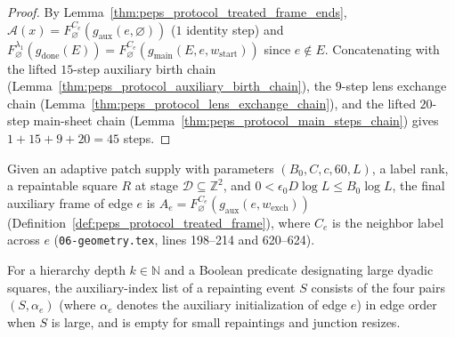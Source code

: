 \begin{proof}\leanok
    By Lemma~\ref{thm:peps_protocol_treated_frame_ends}, $\mathcal A(x)=F_\varnothing^{C_e}(g_{\mathrm{aux}}(e,\varnothing))$ ($1$ identity step) and $F_\varnothing^{\lambda_1}(g_{\mathrm{done}}(E))=F_\varnothing^{C_e}(g_{\mathrm{main}}(E,e,w_{\mathrm{start}}))$ since $e\notin E$. Concatenating with the lifted $15$-step auxiliary birth chain (Lemma~\ref{thm:peps_protocol_auxiliary_birth_chain}), the $9$-step lens exchange chain (Lemma~\ref{thm:peps_protocol_lens_exchange_chain}), and the lifted $20$-step main-sheet chain (Lemma~\ref{thm:peps_protocol_main_steps_chain}) gives $1+15+9+20=45$ steps.
\end{proof}

\begin{definition}
    \label{def:peps_protocol_auxiliary_final_frame}
    \leanok
    Given an adaptive patch supply with parameters $(B_0,C,c,60,L)$, a label rank, a repaintable square $R$ at stage $\mathcal D\subseteq\mathbb Z^2$, and $0<\epsilon_0D\log L\le B_0\log L$, the final auxiliary frame of edge $e$ is $A_e=F_\varnothing^{C_e}(g_{\mathrm{aux}}(e,w_{\mathrm{exch}}))$ (Definition~\ref{def:peps_protocol_treated_frame}), where $C_e$ is the neighbor label across $e$ (\texttt{06-geometry.tex}, lines 198--214 and 620--624).
\end{definition}

\begin{definition}
    \label{def:peps_protocol_event_auxiliary_indices}
    \leanok
    For a hierarchy depth $k\in\mathbb N$ and a Boolean predicate designating large dyadic squares, the auxiliary-index list of a repainting event $S$ consists of the four pairs $(S,\alpha_e)$ (where $\alpha_e$ denotes the auxiliary initialization of edge $e$) in edge order when $S$ is large, and is empty for small repaintings and junction resizes.
\end{definition}

